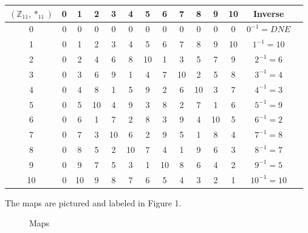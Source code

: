 \documentclass{article}
\begin{document}
\begin{center}
	\begin{tabular}{ |c|c|c|c|c|c|c|c|c|c|c|c|c|c| } 
		\hline
		$(\mathbb{Z}_{11}, *_{11})$ & 0 & 1 & 2 & 3 & 4 & 5 & 6 & 7 & 8 & 9 & 10 & Inverse \\
		\hline
		0 & 0 & 0 & 0 & 0 & 0 & 0 & 0 & 0 & 0 & 0 & 0 & $0^{-1}=DNE$ \\
		1 & 0 & 1 & 2 & 3 & 4 & 5 & 6 & 7 & 8 & 9 & 10 & $1^{-1}=10$ \\
		2 & 0 & 2 & 4 & 6 & 8 & 10 & 1 & 3 & 5 & 7 & 9 & $2^{-1}=6$ \\
		3 & 0 & 3 & 6 & 9 & 1 & 4 & 7 & 10 & 2 & 5 & 8 & $3^{-1}=4$ \\
		4 & 0 & 4 & 8 & 1 & 5 & 9 & 2 & 6 & 10 & 3 & 7 & $4^{-1}=3$ \\
		5 & 0 & 5 & 10 & 4 & 9 & 3 & 8 & 2 & 7 & 1 & 6 & $5^{-1}=9$ \\
		6 & 0 & 6 & 1 & 7 & 2 & 8 & 3 & 9 & 4 & 10 & 5 & $6^{-1}=2$ \\
		7 & 0 & 7 & 3 & 10 & 6 & 2 & 9 & 5 & 1 & 8 & 4 & $7^{-1}=8$ \\
		8 & 0 & 8 & 5 & 2 & 10 & 7 & 4 & 1 & 9 & 6 & 3 & $8^{-1}=7$ \\
		9 & 0 & 9 & 7 & 5 & 3 & 1 & 10 & 8 & 6 & 4 & 2 & $9^{-1}=5$ \\
		10 & 0 & 10 & 9 & 8 & 7 & 6 & 5 & 4 & 3 & 2 & 1 & $10^{-1}=10$ \\
		\hline
	\end{tabular}
\end{center}

\clearpage
\header

The maps are pictured and labeled in Figure 1.
\graphicspath{ {map_image} }
\begin{figure}[h]
	\centering
	\caption{Maps}
\end{figure}
\end{document}

